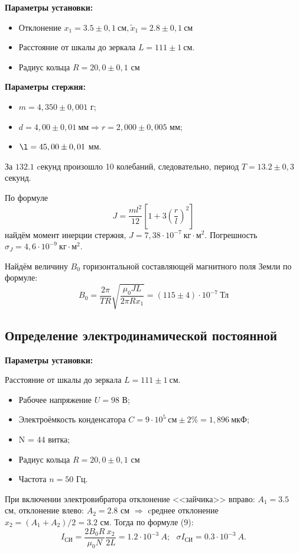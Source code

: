 \documentclass[a4paper,12pt]{article} %
\theoremstyle{plain} %
\theoremstyle{definition} %
\theoremstyle{remark} %
\begin{document}
\begin{large}
\textbf{Параметры установки:}
\begin{itemize}
\item Отклонение $x_1 = 3.5\pm 0,1~\text{см}, \tilde x_1 = 2.8\pm 0,1~\text{см} $
\item Расстояние от шкалы до зеркала $L=111\pm 1~\text{см}.$
\item Радиус кольца $R=20,0\pm 0,1$ см
\end{itemize}


\textbf{Параметры стержня:}
\begin{itemize}
\item $m=4,350\pm 0,001$ г;
\item $d = 4,00\pm 0,01~\text{мм} \Rightarrow r=2,000\pm 0,005$ мм;
\item $\l = 45,00\pm 0,01$ мм.
\end{itemize}


За $132.1$ cекунд произошло 10 колебаний, следовательно, период $T=13.2\pm 0,3$ секунд.

\noindent По формуле   
\[J=\dfrac{ml^2}{12}\left[1+3\left(\dfrac{r}{l}\right)^2\right]\]
найдём момент инерции стержня, $J= 7,38\cdot 10^{-7}~\text{кг}\cdot \text{м}^2$. Погрешность $\sigma_J = 4,6\cdot 10^{-9}~\text{кг}\cdot \text{м}^2.$

\noindent Найдём величину $B_0$ горизонтальной составляющей магнитного поля Земли по формуле:
\[B_0=\dfrac{2\pi}{TR}\sqrt{\dfrac{\mu_0 J L }{2\pi R x_1}}=(115\pm4)\cdot 10^{-7}~\text{Тл}\]


\subsection{Определение электродинамической постоянной}

\textbf{Параметры установки:}
\item Расстояние от шкалы до зеркала $L=111\pm 1~\text{см}.$
\begin{itemize}
\item Рабочее напряжение $U=98$ В;
\item Электроёмкость конденсатора $C=9\cdot 10^5~\text{см}\pm 2\%=1,896~\text{мкФ}$;
\item N = 44 витка;
\item Радиус кольца $R=20,0\pm 0,1$ см
\item Частота $n=50$ Гц.
\end{itemize}

При включении электровибратора отклонение <<зайчика>> вправо: $A_1=3.5$ см, отклонение влево: $A_2=2.8$ см $\Rightarrow$ cреднее отклонение $x_2=(A_1+A_2)/2=3.2$ см. Тогда по формуле (9):
\[I_{\text{СИ}}=\dfrac{2B_0R}{\mu_0 N}\dfrac{x_2}{2L}=1.2\cdot 10^{-3}~A;~~~\sigma I_{\text{СИ}}=0.3\cdot 10^{-3}~A.\]


\end{large}
\end{document}
